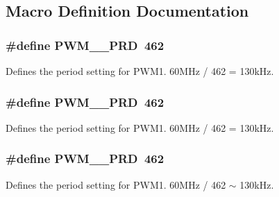 \subsection{Macro Definition Documentation}
\hypertarget{a00038_a4d7cfbafe2831b32ac69043fe2a51d1f}{
\subsubsection[{P\-W\-M\-\_\-1\-\_\-\-P\-R\-D}]{\setlength{\rightskip}{0pt plus 5cm}\#define P\-W\-M\-\_\-\_\-\-P\-R\-D~462}}\label{a00038_a4d7cfbafe2831b32ac69043fe2a51d1f}
Defines the period setting for P\-W\-M1. 60\-M\-Hz / 462 = 130k\-Hz. \hypertarget{a00038_a446b4ce74c284aad70100e3f7fecffa0}{
\subsubsection[{P\-W\-M\-\_\-2\-\_\-\-P\-R\-D}]{\setlength{\rightskip}{0pt plus 5cm}\#define P\-W\-M\-\_\-\_\-\-P\-R\-D~462}}\label{a00038_a446b4ce74c284aad70100e3f7fecffa0}
Defines the period setting for P\-W\-M1. 60\-M\-Hz / 462 = 130k\-Hz. \hypertarget{a00038_a11feddb81d3d7f2f6e001b77685a1f60}{
\subsubsection[{P\-W\-M\-\_\-3\-\_\-\-P\-R\-D}]{\setlength{\rightskip}{0pt plus 5cm}\#define P\-W\-M\-\_\-\_\-\-P\-R\-D~462}}\label{a00038_a11feddb81d3d7f2f6e001b77685a1f60}
Defines the period setting for P\-W\-M1. 60\-M\-Hz / 462 $\sim$ 130k\-Hz. 

